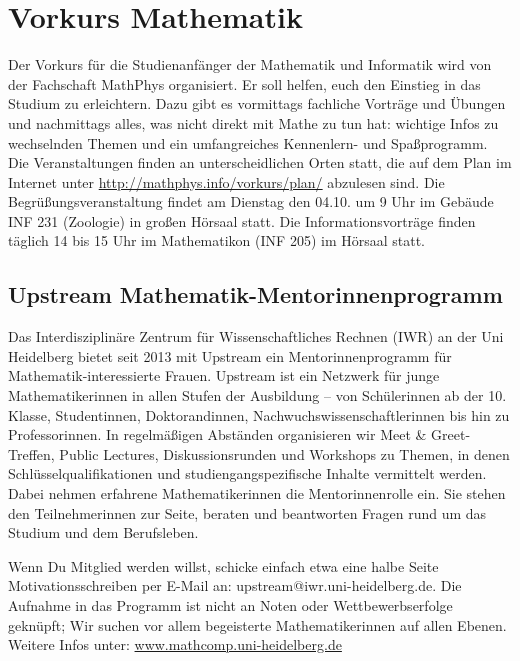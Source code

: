 \section{Vorkurs Mathematik}
\label{vkmathe}

Der Vorkurs für die Studienanfänger der Mathematik und Informatik wird von der
Fachschaft MathPhys organisiert. Er soll helfen, euch den Einstieg in das
Studium zu erleichtern. Dazu gibt es vormittags fachliche Vorträge und Übungen
und nachmittags alles, was nicht direkt mit Mathe zu tun hat: wichtige Infos zu
wechselnden Themen und ein umfangreiches Kennenlern- und Spaßprogramm. Die
Veranstaltungen finden an unterscheidlichen Orten statt, die auf dem Plan im
Internet unter \url{http://mathphys.info/vorkurs/plan/} 
abzulesen sind. Die Begrüßungsveranstaltung findet am Dienstag den 04.10. um 9
Uhr im Gebäude \gls{INF} 231 (Zoologie) in großen Hörsaal statt. Die
Informationsvorträge finden täglich 14 bis 15 Uhr im Mathematikon
(\gls{INF} 205) im Hörsaal statt.


\subsection{Upstream Mathematik-Mentorinnenprogramm}
Das Interdisziplinäre Zentrum für Wissenschaftliches Rechnen (IWR) an der Uni
Heidelberg bietet seit 2013 mit Upstream ein Mentorinnenprogramm für
Mathematik-interessierte Frauen.  Upstream ist ein Netzwerk für junge
Mathematikerinnen in allen Stufen der Ausbildung -- von Schülerinnen ab der 10.
Klasse, Studentinnen, Doktorandinnen, Nachwuchswissenschaftlerinnen bis hin zu
Professorinnen. In regelmäßigen Abständen organisieren wir Meet \&
Greet-Treffen, Public Lectures, Diskussionsrunden und Workshops zu Themen, in
denen Schlüsselqualifikationen und studiengangspezifische Inhalte vermittelt
werden. Dabei nehmen erfahrene Mathematikerinnen die Mentorinnenrolle ein. Sie
stehen den Teilnehmerinnen zur Seite, beraten und beantworten Fragen rund um
das Studium und dem Berufsleben.

Wenn Du Mitglied werden willst, schicke einfach etwa eine halbe Seite
Motivationsschreiben per E-Mail an: upstream@iwr.uni-heidelberg.de. Die Aufnahme
in das Programm ist nicht an Noten oder Wettbewerbserfolge geknüpft; Wir suchen
vor allem begeisterte Mathematikerinnen auf allen Ebenen.  Weitere Infos unter:
\url{www.mathcomp.uni-heidelberg.de}
